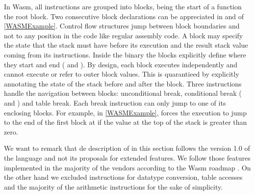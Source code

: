 In Wasm, all instructions are grouped into blocks, being the start of a function the root block. Two consecutive block declarations can be appreciated in  and  of \autoref{WASMExample}. Control flow structures jump between block boundaries and not to any position in the code like regular assembly code. A block may specify the state that the stack must have before its execution and the result stack value coming from its instructions. Inside the binary the blocks explicitly define where they start and end ( and ). By design, each block executes independently and cannot execute or refer to outer block values. This is quarantieed by explicitly annotating the state of the stack before and after the block. Three instructions handle the navigation between blocks: unconditional break, conditional break ( and ) and table break. Each break instruction can only jump to one of its enclosing blocks. For example, in \autoref{WASMExample},  forces the execution to jump to the end of the first block at  if the value at the top of the stack is greater than zero.

We want to remark that de description of in this section follows the version 1.0 of the language and not its proposals for extended features. We follow those features implemented in the majority of the vendors according to the Wasm roadmap \cite{wasm_roadmap}. On the other hand we excluded instructions for datatype conversion, table accesses and the majority of the arithmetic instructions for the sake of simplicity.








